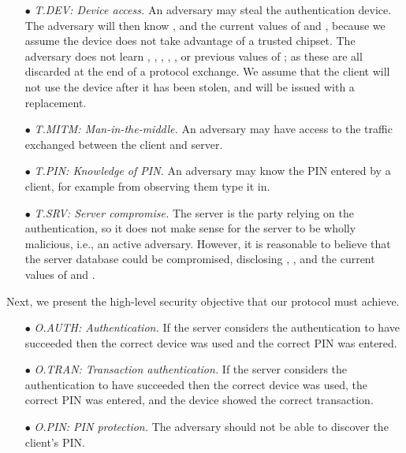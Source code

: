 \begin{itemize}
\item[$\bullet$]\textit{T.DEV: Device access.} An adversary may steal the authentication device. The adversary will then know , \VC{\salt} and the current values of \VC{\counter} and \VC{\state}, because we assume the device does not take advantage of a trusted chipset. The adversary does not learn \VC{\verifier}, \VM{\trans}, \VC{\pin}, , ,  or previous values of \VC{\state}; as these are all discarded at the end of a protocol exchange. We assume that the client will not use the device after it has been stolen, and will be issued with a replacement.


\item[$\bullet$]\textit{T.MITM: Man-in-the-middle.} An adversary may have access to the traffic exchanged between the client and server.

\item[$\bullet$]\textit{T.PIN: Knowledge of PIN.} An adversary may know the PIN entered by a client, for example from observing them type it in.

\item[$\bullet$]\textit{T.SRV: Server compromise.} The server is the party relying on the authentication, so it does not make sense for the server to be wholly malicious, i.e., an active adversary.
However, it is reasonable to believe that the server database could be compromised, disclosing , \VS{\verifier}, and the current values of \VC{\counter} and \VC{\state}.


\end{itemize}


Next, we present the high-level security objective that our protocol must achieve. 

\begin{itemize}
\item[$\bullet$]\textit{O.AUTH: Authentication.} If the server considers the authentication to have succeeded then the correct device was used and the correct PIN was entered.

\item[$\bullet$]\textit{O.TRAN: Transaction authentication.} If the server considers the authentication to have succeeded then the correct device was used, the correct PIN was entered, and the device showed the correct transaction.

\item[$\bullet$]\textit{O.PIN: PIN protection.} The adversary should not be able to discover the client's PIN. 
\end{itemize}



